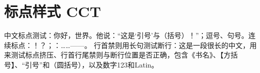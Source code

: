 \documentclass[a4paper,10pt,UTF8,scheme=chinese]{ctexart}
\begin{document}
\section{标点样式 CCT}
中文标点测试：你好，世界。他说：“这是‘引号’与（括号）！”；逗号、句号。连续标点：！？；：……——。
行首禁则用长句测试断行：这是一段很长的中文，用来测试标点挤压、行首行尾禁则与断行位置是否正确，包含《书名》、【方括号】、“引号”和（圆括号），以及数字123和Latin。
\end{document}
